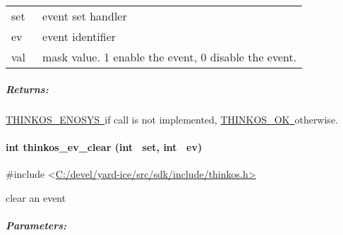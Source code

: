 {\begin{longtable}[]{@{}ll@{}}
\toprule
\begin{minipage}[t]{0.47\columnwidth}\raggedright\strut
{set}{~}\strut
\end{minipage} & \begin{minipage}[t]{0.47\columnwidth}\raggedright\strut
{event set handler }\strut
\end{minipage}\tabularnewline
\begin{minipage}[t]{0.47\columnwidth}\raggedright\strut
{ev}{~}\strut
\end{minipage} & \begin{minipage}[t]{0.47\columnwidth}\raggedright\strut
{event identifier }\strut
\end{minipage}\tabularnewline
\begin{minipage}[t]{0.47\columnwidth}\raggedright\strut
{val}{~}\strut
\end{minipage} & \begin{minipage}[t]{0.47\columnwidth}\raggedright\strut
{mask value. 1 enable the event, 0 disable the event. }\strut
\end{minipage}\tabularnewline
\bottomrule
\end{longtable}

\subparagraph{\texorpdfstring{{Returns:}}{Returns:}}\label{returns-34}

{\protect\hyperlink{h.3s49zyc}{THINKOS\_ENOSYS}}{\protect\hyperlink{h.3s49zyc}{~}}{if
call is not implemented,
}{\protect\hyperlink{h.2fk6b3p}{THINKOS\_OK}}{\protect\hyperlink{h.2fk6b3p}{~}}{otherwise.
}

\paragraph{\texorpdfstring{{int thinkos\_ev\_clear (int ~set, int
~ev)}}{int thinkos\_ev\_clear (int ~set, int ~ev)}}\label{int-thinkos_ev_clear-int-set-int-ev}

{}

{\#include
\textless{}}{\protect\hyperlink{h.pkwqa1}{C:/devel/yard-ice/src/sdk/include/thinkos.h}}{\protect\hyperlink{h.pkwqa1}{\textgreater{}}}

{clear an event }

{}

\subparagraph{\texorpdfstring{{Parameters:}}{Parameters:}}\label{parameters-32}

\protect\hypertarget{t.edc44c26eda9f56c94bb61cc6c572ae53f165af7}{}{}\protect\hypertarget{t.32}{}{}

}
